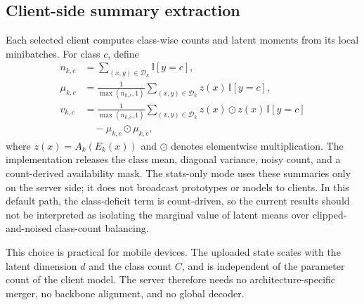 \documentclass[10pt,journal]{IEEEtran}
\newcommand{\statsonly}{stats-only}
\begin{document}
\subsection{Client-side summary extraction}
Each selected client computes class-wise counts and latent moments from its local minibatches. For class $c$, define
\begin{align}
n_{k,c} &= \sum_{(x,y)\in\mathcal{D}_k}\mathbb{I}[y=c], \\
\mu_{k,c} &= \frac{1}{\max(n_{k,c},1)}
\sum_{(x,y)\in\mathcal{D}_k} z(x)\,\mathbb{I}[y=c], \\
v_{k,c} &= \frac{1}{\max(n_{k,c},1)}
\sum_{(x,y)\in\mathcal{D}_k} z(x)\odot z(x)\,\mathbb{I}[y=c]
\nonumber\\
&\quad -\mu_{k,c}\odot\mu_{k,c},
\end{align}
where $z(x)=A_k(E_k(x))$ and $\odot$ denotes elementwise multiplication. The implementation releases the class mean, diagonal variance, noisy count, and a count-derived availability mask. The \statsonly{} mode uses these summaries only on the server side; it does not broadcast prototypes or models to clients. In this default path, the class-deficit term is count-driven, so the current results should not be interpreted as isolating the marginal value of latent means over clipped-and-noised class-count balancing.

This choice is practical for mobile devices. The uploaded state scales with the latent dimension $d$ and the class count $C$, and is independent of the parameter count of the client model. The server therefore needs no architecture-specific merger, no backbone alignment, and no global decoder.
\end{document}
